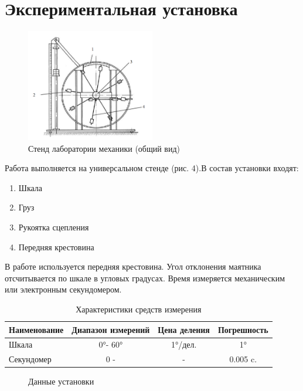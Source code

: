 \documentclass[a4paper]{article}
\begin{document}
\section{\textbf{Экспериментальная установка}}



\begin{figure}[H]
\centering
\includegraphics[width=0.5\textwidth]{1.05.4.png}
\caption{Стенд лаборатории механики (общий вид)}
\end{figure}


Работа выполняется на универсальном стенде (рис. 4).В состав установки входят:
\begin{enumerate}
    \item Шкала
    \item Груз
    \item Рукоятка сцепления
    \item Передняя крестовина
\end{enumerate}

В работе используется передняя крестовина. Угол отклонения маятника отсчитывается по шкале в угловых градусах. Время измеряется механическим или электронным секундомером.



\begin{table}[H]
\centering
\begin{tabular}{|l|c|c|c|}
\hline
Наименование & Диапазон измерений & Цена деления & Погрешность \\
\hline
Шкала & 0°- 60° & 1°/дел. & 1° \\
\hline
Секундомер & 0 -  & - & 0.005 c. \\
\hline
\end{tabular}
\caption{Характеристики средств измерения}
\end{table}
\begin{figure}[H]
\centering
\vspace{-0\textwidth}
\caption{Данные установки}
\end{figure}
\end{document}
